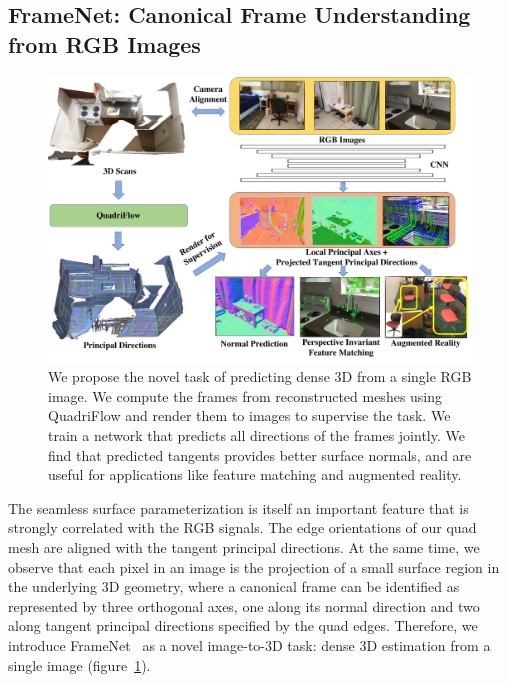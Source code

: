 \subsection{FrameNet: Canonical Frame Understanding from RGB Images}
\label{intro:frame}
 \begin{figure}
    \centering
    \includegraphics[width=0.75\linewidth]{FrameNet/graph/teaser.pdf}
    \caption{We propose the novel task of predicting dense 3D \cframe{} from a single RGB image. We compute the frames from reconstructed meshes using QuadriFlow and render them to images to supervise the task.  We train a network that predicts all directions of the frames jointly.  We find that predicted tangents provides better surface normals, and are useful for applications like feature matching and augmented reality.}
    \label{fig:framenet-teaser}
    \vspace{-0.1in}
\end{figure}
The seamless surface parameterization is itself an important feature that is strongly correlated with the RGB signals. The edge orientations of our quad mesh are aligned with the tangent principal directions. At the same time, we observe that each pixel in an image is the projection of a small surface region in the underlying 3D geometry, where a canonical frame can be identified as represented by three orthogonal axes, one along its normal direction and two along tangent principal directions specified by the quad edges. Therefore, we introduce FrameNet~\cite{framenet} as a novel image-to-3D task: dense 3D \cframe{} estimation from a single image (figure~\ref{fig:framenet-teaser}).


